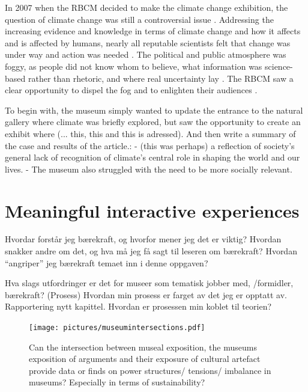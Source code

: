 In 2007 when the RBCM decided to make the climate change exhibition, the question of climate change was still a controversial issue \autocite[p.2]{hebda_article}. Addressing the increasing evidence and knowledge in terms of climate change and how it affects and is affected by humans, nearly all reputable scientists felt that change was under way and action was needed \autocite[p.2]{hebda_article}. The political and public atmosphere was foggy, as people did not know whom to believe, what information was science-based rather than rhetoric, and where real uncertainty lay \autocite[p.2]{hebda_article}. The RBCM saw a clear opportunity to dispel the fog and to enlighten their audiences \autocite[p.2]{hebda_article}.

To begin with, the museum simply wanted to update the entrance to the natural gallery where climate was briefly explored, but saw the opportunity to create an exhibit where (... this, this and this is adressed). And then write a summary of the case and results of the article.:
- (this was perhaps) a reflection of society’s general lack of recognition of climate’s central role in shaping the world and our lives.
- The museum also struggled with the need to be more socially relevant.

\section{Meaningful interactive experiences}
Hvordar forstår jeg bærekraft, og hvorfor mener jeg det er viktig?
Hvordan snakker andre om det, og hva må jeg få sagt til leseren om bærekraft?
Hvordan “angriper” jeg bærekraft temaet inn i denne oppgaven? 

Hva slags utfordringer er det for museer som tematisk jobber med, /formidler, bærekraft? (Prosess) Hvordan min prosess er farget av det jeg er opptatt av. Rapportering nytt kapittel. Hvordan er prosessen min koblet til teorien?

\begin{figure}[h]
\texttt{[image: pictures/museumintersections.pdf]}
\caption{Can the intersection between museal exposition, the museums exposition of arguments and their exposure of cultural artefact provide data or finds on power structures/ tensions/ imbalance in museums? Especially in terms of sustainability?}
\centering
\end{figure}



